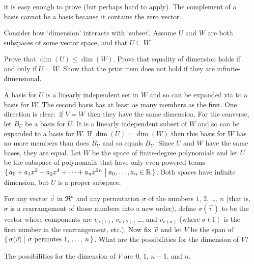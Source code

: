 \begin{exercises}
\begin{answer}
\begin{exparts}
           it is easy enough to prove (but perhaps hard to apply).
         \partsitem The complement of a basis cannot be a basis
           because it contains the zero vector.
       \end{exparts}  
     \end{answer}
  \recommended \item 
    Consider how `dimension' interacts with `subset'.
    Assume \( U \) and \( W \) are both subspaces of some vector space, and
    that \( U\subseteq W \).
    \begin{exparts}
      \partsitem Prove that \( \dim (U)\leq\dim (W) \).
      \partsitem Prove that equality of dimension holds
        if and only if \( U=W \).
      \partsitem Show that the prior item does not hold if they are 
        infinite-dimensional.
    \end{exparts}
    \begin{answer}
       \begin{exparts}
          \partsitem A basis for \( U \) is a linearly independent set
            in \( W \)
            and so can be expanded via 
            to a basis for \( W \).
            The second basis has at least as many members as the first.
          \partsitem One direction is clear:~if \( V=W \) then they have the 
            same dimension.
            For the converse, let \( B_U \) be a basis for \( U \).
            It is a linearly independent subset of \( W \) and so can be
            expanded to a basis for \( W \).
            If \( \dim(U)=\dim(W) \) then this basis for \( W \) has no more
            members than does \( B_U \) and so equals \( B_U \).
            Since \( U \) and \( W \) have the same bases, they are equal.
          \partsitem Let \( W \) be the space of finite-degree polynomials and
            let \( U \) be the subspace of polynomails that have only
            even-powered terms
            \( \mbox{$\{\,a_0+a_1x^2+a_2x^4+\dots+a_nx^{2n}\bigm|
                a_0,\ldots,a_n\in\mathbb{R}\,\}$} \).
            Both spaces have infinite dimension, but \( U \) is a proper
            subspace.
       \end{exparts}  
     \end{answer}
  \puzzle \item 
    For any vector $\vec{v}$ in $\Re^n$ and any permutation $\sigma$
    of the numbers $1$, $2$, \ldots, $n$
    (that is, $\sigma$ is a rearrangement of those numbers into a new order), 
    define $\sigma(\vec{v})$ to be the vector whose components are 
    $v_{\sigma(1)}$, $v_{\sigma(2)}$, \ldots, and $v_{\sigma(n)}$
    (where $\sigma(1)$ is the first number in the rearrangement, etc.).
    Now fix $\vec{v}$ and let $V$ be the span of 
    $\mbox{$\{\,\sigma(\vec{v})\bigm| \mbox{$\sigma$ permutes $1$, \ldots, $n$}\,\}$}$.
    What are the possibilities for the dimension of $V$?
    \cite{Wohascum47}
    \begin{answer}
      The possibilities for the dimension of $V$ are $0$, $1$, $n-1$,
      and $n$.


\end{answer}
\end{exercises}
